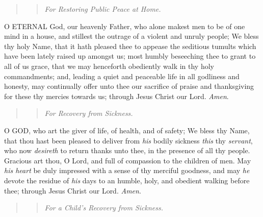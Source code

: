 \begin{quote}

\begin{quote}

\emph{For
Restoring Public Peace at Home.}

\end{quote}

\end{quote}

O
ETERNAL God, our heavenly Father, who alone makest men to be of one mind
in a house, and stillest the outrage of a violent and unruly people; We
bless thy holy Name, that it hath pleased thee to appease the seditious
tumults which have been lately raised up amongst us; most humbly beseeching
thee to grant to all of us grace, that we may henceforth obediently walk
in thy holy commandments; and, leading a quiet and peaceable life in all
godliness and honesty, may continually offer unto thee our sacrifice of
praise and thanksgiving for these thy mercies towards us; through Jesus
Christ our Lord. \emph{Amen}.

\begin{quote}

\begin{quote}

\emph{For
Recovery from Sickness.}

\end{quote}

\end{quote}

O
GOD, who art the giver of life, of health, and of safety; We bless thy
Name, that thou hast been pleased to deliver from \emph{his} bodily
sickness \emph{this} thy \emph{servant}, who now \emph{desireth}
to return thanks unto thee, in the presence of all thy people. Gracious
art thou, O Lord, and full of compassion to the children of men. May \emph{his
heart} be duly impressed with a sense of thy merciful goodness, and
may \emph{he} devote the residue of \emph{his} days to an humble,
holy, and obedient walking before thee; through Jesus Christ our Lord.
\emph{Amen}.

\begin{quote}

\begin{quote}

\emph{For
a Child’s Recovery from Sickness.}

\end{quote}

\end{quote}

